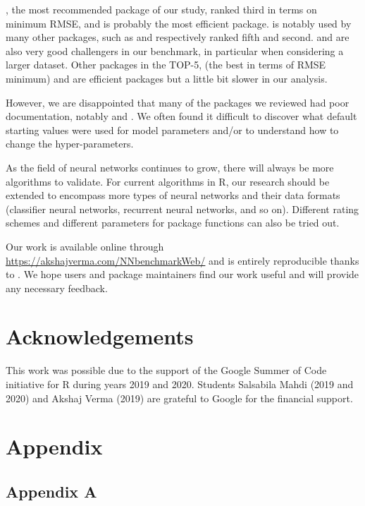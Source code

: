 , the most recommended package of our study, ranked third in
terms on minimum RMSE, and is probably the most efficient package.
 is notably used by many other packages, such as
 and  respectively ranked fifth and second.
 and  are also very good challengers in our
benchmark, in particular when considering a larger dataset. Other
packages in the TOP-5,  (the best in terms of RMSE minimum)
and  are efficient packages but a little bit slower in our
analysis.

However, we are disappointed that many of the packages we reviewed had
poor documentation, notably  and . We often
found it difficult to discover what default starting values were used
for model parameters and/or to understand how to change the
hyper-parameters.

As the field of neural networks continues to grow, there will always be
more algorithms to validate. For current algorithms in R, our research
should be extended to encompass more types of neural networks and their
data formats (classifier neural networks, recurrent neural networks, and
so on). Different rating schemes and different parameters for package
functions can also be tried out.

Our work is available online through
\url{https://akshajverma.com/NNbenchmarkWeb/} and is entirely
reproducible thanks to . We hope users and package
maintainers find our work useful and will provide any necessary
feedback.

\hypertarget{acknowledgements}{%
\section{Acknowledgements}\label{acknowledgements}}

This work was possible due to the support of the Google Summer of Code
initiative for R during years 2019 and 2020. Students Salsabila Mahdi
(2019 and 2020) and Akshaj Verma (2019) are grateful to Google for the
financial support.



\hypertarget{appendix}{%
\section{Appendix}\label{appendix}}

\hypertarget{appendix-a}{%
\subsection{Appendix A}\label{appendix-a}}

